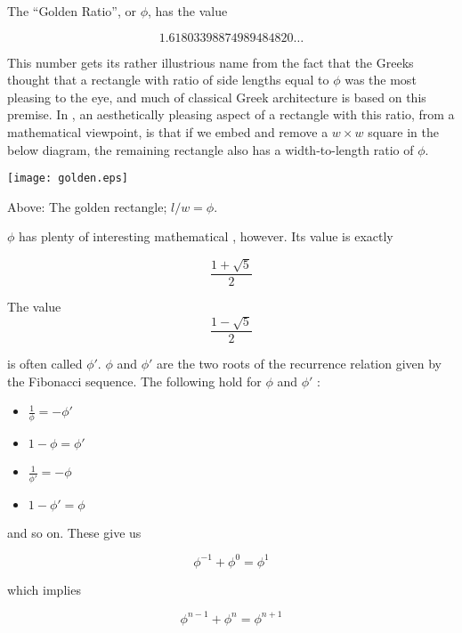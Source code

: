 \documentclass{article}
\begin{document}
The ``Golden Ratio'', or $\phi$, has the value 

$$ 1.61803398874989484820\ldots $$

This number gets its rather illustrious name from the fact that the Greeks thought that a rectangle with ratio of side lengths equal to $\phi$ was the most pleasing to the eye, and much of classical Greek architecture is based on this premise.  In , an aesthetically pleasing aspect of a rectangle with this ratio, from a mathematical viewpoint, is that if we embed and remove a $w\times w$ square in the below diagram, the remaining rectangle also has a width-to-length ratio of $\phi$.

\begin{center}

\texttt{[image: golden.eps]}

{\tiny Above: The golden rectangle; $l/w = \phi$. }
\end{center}

$\phi$ has plenty of interesting mathematical , however.  Its value is exactly

$$ \frac{1+\sqrt{5}}{2} $$

The value 
$$ \frac{1-\sqrt{5}}{2} $$

is often called $\phi'$.  $\phi$ and $\phi'$ are the two roots of the recurrence relation given by the Fibonacci sequence.  The following  hold for $\phi$ and $\phi'$ :

\begin{itemize}
\item $\frac{1}{\phi} = - \phi' $
\item $1-\phi = \phi'$
\item $\frac{1}{\phi'} = - \phi $
\item $1-\phi' = \phi $
\end{itemize}

and so on.  These give us

$$ \phi^{-1} + \phi^0 = \phi^{1} $$

which implies 

$$ \phi^{n-1} + \phi^n = \phi^{n+1} $$
\end{document}
